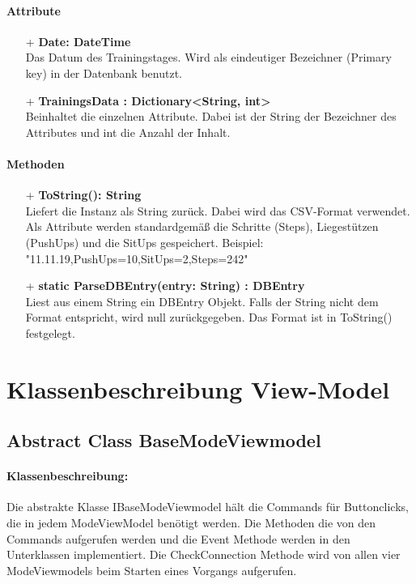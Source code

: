 \documentclass[a4paper,12pt]{article}
\begin{document}
	\paragraph{Attribute}
	\begin{itemize}
		\item[+] \textbf{Date: DateTime}\\Das Datum des Trainingstages. Wird als eindeutiger Bezeichner (Primary key) in der \Gls{Datenbank} benutzt.\\
			\item[+] \textbf{TrainingsData : Dictionary<String, int>}\\ Beinhaltet die einzelnen Attribute. Dabei ist der String der Bezeichner des Attributes und int die Anzahl der Inhalt. 
	\end{itemize}
	 
	 \paragraph{Methoden}
	 \begin{itemize}
	 	\item[+] \textbf{ToString(): String}\\Liefert die Instanz als String zurück. Dabei wird das \gls{CSV}-Format verwendet. Als Attribute werden standardgemäß die Schritte (Steps), Liegestützen (PushUps) und die SitUps gespeichert.
	 	Beispiel: "11.11.19,PushUps=10,SitUps=2,Steps=242"\\
	 	\item[+] \textbf{static ParseDBEntry(entry: String) : DBEntry}\\Liest aus einem String ein DBEntry Objekt. Falls der String nicht dem Format entspricht, wird null zurückgegeben. Das Format ist in ToString() festgelegt.\\
	\end{itemize}











\section{Klassenbeschreibung View-Model}
\subsection{Abstract Class BaseModeViewmodel} 
\paragraph{Klassenbeschreibung:}
Die abstrakte Klasse IBaseModeViewmodel hält die Commands für Buttonclicks, die in jedem ModeViewModel benötigt werden. Die Methoden die von den Commands aufgerufen werden und die Event Methode werden in den Unterklassen implementiert. Die CheckConnection Methode wird von allen vier ModeViewmodels beim Starten eines Vorgangs aufgerufen.
\end{document}
